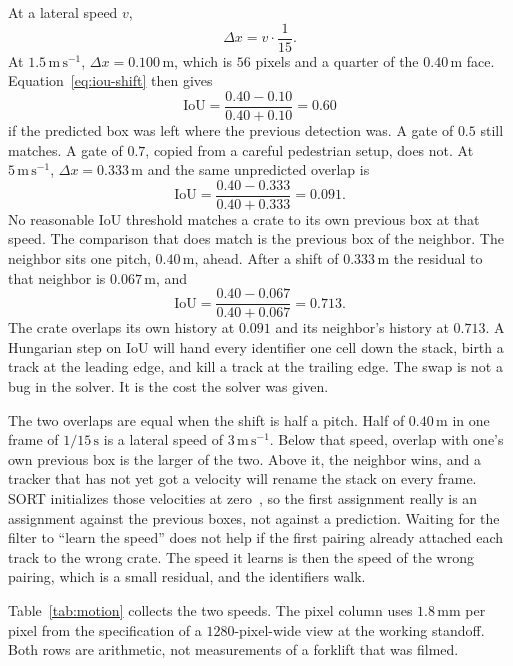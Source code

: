 \documentclass[11pt,a4paper]{article}
\begin{document}
At a lateral speed $v$,
\begin{equation}
\Delta x = v\cdot \frac{1}{15}.
\label{eq:dx}
\end{equation}
At $1.5\,\mathrm{m\,s^{-1}}$, $\Delta x = 0.100\,\mathrm{m}$, which is $56$ pixels and a quarter of the $0.40\,\mathrm{m}$ face. Equation~\eqref{eq:iou-shift} then gives
\[
\mathrm{IoU} = \frac{0.40-0.10}{0.40+0.10} = 0.60
\]
if the predicted box was left where the previous detection was. A gate of $0.5$ still matches. A gate of $0.7$, copied from a careful pedestrian setup, does not. At $5\,\mathrm{m\,s^{-1}}$, $\Delta x = 0.333\,\mathrm{m}$ and the same unpredicted overlap is
\[
\mathrm{IoU} = \frac{0.40-0.333}{0.40+0.333} = 0.091.
\]
No reasonable IoU threshold matches a crate to its own previous box at that speed. The comparison that does match is the previous box of the neighbor. The neighbor sits one pitch, $0.40\,\mathrm{m}$, ahead. After a shift of $0.333\,\mathrm{m}$ the residual to that neighbor is $0.067\,\mathrm{m}$, and
\[
\mathrm{IoU} = \frac{0.40-0.067}{0.40+0.067} = 0.713.
\]
The crate overlaps its own history at $0.091$ and its neighbor's history at $0.713$. A Hungarian step on IoU will hand every identifier one cell down the stack, birth a track at the leading edge, and kill a track at the trailing edge. The swap is not a bug in the solver. It is the cost the solver was given.

The two overlaps are equal when the shift is half a pitch. Half of $0.40\,\mathrm{m}$ in one frame of $1/15\,\mathrm{s}$ is a lateral speed of $3\,\mathrm{m\,s^{-1}}$. Below that speed, overlap with one's own previous box is the larger of the two. Above it, the neighbor wins, and a tracker that has not yet got a velocity will rename the stack on every frame. SORT initializes those velocities at zero~\cite{bewley2016sort}, so the first assignment really is an assignment against the previous boxes, not against a prediction. Waiting for the filter to ``learn the speed'' does not help if the first pairing already attached each track to the wrong crate. The speed it learns is then the speed of the wrong pairing, which is a small residual, and the identifiers walk.

Table~\ref{tab:motion} collects the two speeds. The pixel column uses $1.8\,\mathrm{mm}$ per pixel from the specification of a $1280$-pixel-wide view at the working standoff. Both rows are arithmetic, not measurements of a forklift that was filmed.
\end{document}
